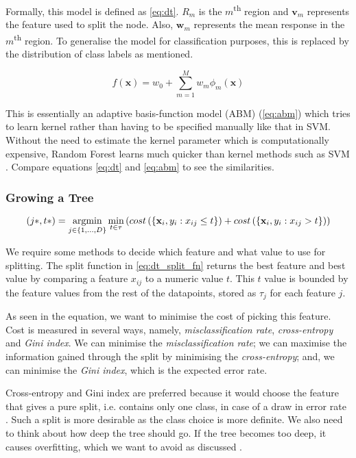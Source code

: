 Formally, this model is defined as \autoref{eq:dt}. $R_m$ is the $m$\textsuperscript{th} region and $\mathbf{v}_m$ represents the feature used to split the node. Also, $\mathbf{w}_m$ represents the mean response in the $m$\textsuperscript{th} region. To generalise the model for classification purposes, this is replaced by the distribution of class labels as mentioned.

\begin{equation} \label{eq:abm}
  f(\mathbf{x}) = w_0 + \sum_{m=1}^{M} w_m\phi_m(\mathbf{x})
\end{equation}

This is essentially an adaptive basis-function model (ABM) (\autoref{eq:abm}) which tries to learn kernel rather than having to be specified manually like that in SVM. Without the need to estimate the kernel parameter which is computationally expensive, Random Forest learns much quicker than kernel methods such as SVM \cite{mur-book}. Compare equations \ref{eq:dt} and \ref{eq:abm} to see the similarities.

\subsubsection{Growing a Tree}
\begin{equation} \label{eq:dt_split_fn}
  (j*, t*) = \operatornamewithlimits{argmin}_{j \in \{1, ...,D\}} \operatornamewithlimits{min}_{t \in \tau} 
  \left( 
    cost \left(\{\mathbf{x}_i, y_i : x_{ij} \leq t \}\right) +
    cost \left(\{\mathbf{x}_i, y_i : x_{ij} > t\}\right)
  \right)
\end{equation}

We require some methods to decide which feature and what value to use for splitting. The split function in \autoref{eq:dt_split_fn} returns the best feature and best value by comparing a feature $x_{ij}$ to a numeric value $t$. This $t$ value is bounded by the feature values from the rest of the datapoints, stored as $\tau_{j}$ for each feature $j$.

As seen in the equation, we want to minimise the cost of picking this feature. Cost is measured in several ways, namely, \textit{misclassification rate}, \textit{cross-entropy} and \textit{Gini index}. We can minimise the \textit{misclassification rate}; we can maximise the information gained through the split by minimising the \textit{cross-entropy}; and, we can minimise the \textit{Gini index}, which is the expected error rate. 

Cross-entropy and Gini index are preferred because it would choose the feature that gives a pure split, i.e. contains only one class, in case of a draw in error rate \cite{mur-book}. Such a split is more desirable as the class choice is more definite. We also need to think about how deep the tree should go. If the tree becomes too deep, it causes overfitting, which we want to avoid as discussed \cite{mur-book}. 


